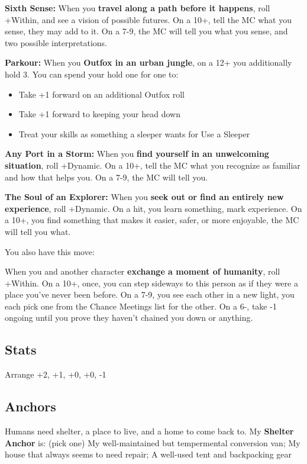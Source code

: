 \documentclass[
]{memoir}
\begin{document}
\textbf{Sixth Sense:} When you \textbf{travel along a path before it
happens}, roll +Within, and see a vision of possible futures. On a 10+,
tell the MC what you sense, they may add to it. On a 7-9, the MC will
tell you what you sense, and two possible interpretations.

\textbf{Parkour:} When you \textbf{Outfox in an urban jungle}, on a 12+
you additionally hold 3. You can spend your hold one for one to:

\begin{itemize}
\tightlist
\item
  Take +1 forward on an additional Outfox roll
\item
  Take +1 forward to keeping your head down
\item
  Treat your skills as something a sleeper wants for Use a Sleeper
\end{itemize}

\textbf{Any Port in a Storm:} When you \textbf{find yourself in an
unwelcoming situation}, roll +Dynamic. On a 10+, tell the MC what you
recognize as familiar and how that helps you. On a 7-9, the MC will tell
you.

\textbf{The Soul of an Explorer:} When you \textbf{seek out or find an
entirely new experience}, roll +Dynamic. On a hit, you learn something,
mark experience. On a 10+, you find something that makes it easier,
safer, or more enjoyable, the MC will tell you what.

You also have this move:

When you and another character \textbf{exchange a moment of humanity},
roll +Within. On a 10+, once, you can step sideways to this person as if
they were a place you've never been before. On a 7-9, you see each other
in a new light, you each pick one from the Chance Meetings list for the
other. On a 6-, take -1 ongoing until you prove they haven't chained you
down or anything.

\hypertarget{stats-9}{%
\subsection{Stats}\label{stats-9}}

Arrange +2, +1, +0, +0, -1

\hypertarget{anchors-8}{%
\subsection{Anchors}\label{anchors-8}}

Humans need shelter, a place to live, and a home to come back to. My
\textbf{Shelter Anchor} is: (pick one) My well-maintained but
tempermental conversion van; My house that always seems to need repair;
A well-used tent and backpacking gear
\end{document}
